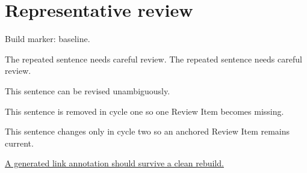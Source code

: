 \documentclass{article}
\begin{document}
\section{Representative review}

\newcommand{\placekeeperbuildlabel}{baseline}
Build marker: \placekeeperbuildlabel.

The repeated sentence needs careful review. The repeated sentence needs careful review.

This sentence can be revised unambiguously.

This sentence is removed in cycle one so one Review Item becomes missing.

This sentence changes only in cycle two so an anchored Review Item remains current.

\href{https://example.invalid}{A generated link annotation should survive a clean rebuild.}

\end{document}
